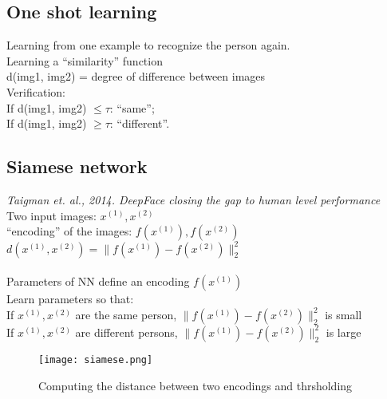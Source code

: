 %
\subsection{One shot learning}
Learning from one example to recognize the person again.\\
Learning a ``similarity'' function\\
d(img1, img2) = degree of difference between images\\
Verification:\\
If d(img1, img2) $\le \tau$: ``same'';\\
If d(img1, img2) $\ge \tau$: ``different''.\\

%
\subsection{Siamese network}

\textit{Taigman et. al., 2014. DeepFace closing the gap to human level performance}\\
Two input images: $x^{(1)}, x^{(2)}$\\
``encoding'' of the images: $f(x^{(1)}), f(x^{(2)})$\\
$d(x^{(1)}, x^{(2)}) = \lVert f(x^{(1)}) - f(x^{(2)}) \rVert_2^2$\\
\\
Parameters of NN define an encoding $f(x^{(1)})$\\
Learn parameters so that:\\
If $x^{(1)}, x^{(2)}$ are the same person, $\lVert f(x^{(1)}) - f(x^{(2)}) \rVert_2^2$ is small\\
If $x^{(1)}, x^{(2)}$ are different  persons, $\lVert f(x^{(1)}) - f(x^{(2)}) \rVert_2^2$ is large\\

\begin{figure}[h]
    \centering
    \texttt{[image: siamese.png]}
    \caption{Computing the distance between two encodings and thrsholding}
    \label{fig:siamese}
\end{figure}

